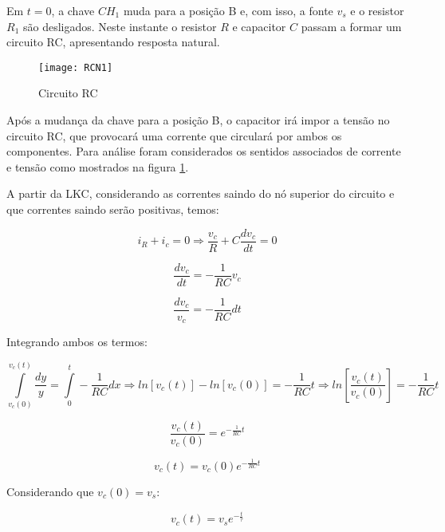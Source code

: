 \documentclass[12pt,fleqn]{book} %
\begin{document}
{Em $t=0$, a chave $CH_1$ muda para a posição B e, com isso, a fonte $v_s$ e o resistor $R_1$ são desligados. Neste instante o resistor $R$ e capacitor $C$ passam a formar um circuito RC, apresentando resposta natural.

\begin{figure}[!htbp] \centering\texttt{[image: RCN1]}
            \caption{Circuito RC}\label{RCN1} 
        \end{figure} 

Após a mudança da chave para a posição B, o capacitor irá impor a tensão no circuito RC, que provocará uma corrente que circulará por ambos os componentes. Para análise foram considerados os sentidos associados de corrente e tensão como mostrados na figura \ref{RCN1}.

A partir da LKC, considerando as correntes saindo do nó superior do circuito e que correntes saindo serão positivas, temos:

\begin{equation}
i_R+i_c=0  \Rightarrow \frac{v_c}{R}+C\frac{dv_c}{dt}=0
\end{equation}

\begin{equation}
\frac{dv_c}{dt}=-\frac{1}{RC}v_c
\end{equation}

\begin{equation}
\frac{dv_c}{v_c}=-\frac{1}{RC}dt
\end{equation}

Integrando ambos os termos:

\begin{equation}
\int\limits_{v_c(0)}^{v_c(t)}\frac{dy}{y} = \int\limits_{0}^{t}-\frac{1}{RC}dx \Rightarrow ln[v_c(t)]-ln[v_c(0)]=-\frac{1}{RC} t \Rightarrow ln[\frac{v_c(t)}{v_c(0)}]= -\frac{1}{RC} t
\end{equation}

\begin{equation}
\frac{v_c(t)}{v_c(0)} = e^{-\frac{1}{RC} t}
\end{equation}

\begin{equation}
v_c(t) = v_c(0)e^{-\frac{1}{RC} t}
\end{equation}

Considerando que $v_c(0) = v_s$:

\begin{equation}
v_c(t) = v_se^{-\frac{t}{\tau}}
\end{equation}

}
\end{document}
